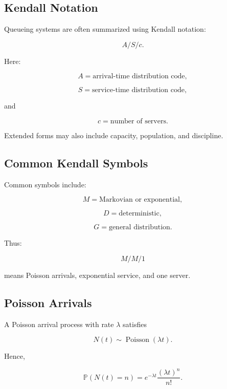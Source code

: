 \subsection{Kendall Notation}
\label{subsec:kendall-notation}

Queueing systems are often summarized using Kendall notation:

\[
\boxed{
A/S/c.
}
\]

Here:

\[
A
=
\text{arrival-time distribution code},
\]

\[
S
=
\text{service-time distribution code},
\]

and

\[
c
=
\text{number of servers}.
\]

Extended forms may also include capacity, population, and discipline.

\subsection{Common Kendall Symbols}
\label{subsec:kendall-symbols}

Common symbols include:

\[
\boxed{
M
=
\text{Markovian or exponential},
}
\]

\[
\boxed{
D
=
\text{deterministic},
}
\]

\[
\boxed{
G
=
\text{general distribution}.
}
\]

Thus:

\[
\boxed{
M/M/1
}
\]

means Poisson arrivals, exponential service, and one server.

\subsection{Poisson Arrivals}
\label{subsec:poisson-arrivals}

A Poisson arrival process with rate \(\lambda\) satisfies

\[
\boxed{
N(t)
\sim
\operatorname{Poisson}(\lambda t).
}
\]

Hence,

\[
\boxed{
\mathbb{P}(N(t)=n)
=
e^{-\lambda t}
\frac{
(\lambda t)^n
}{
n!
}.
}
\]

